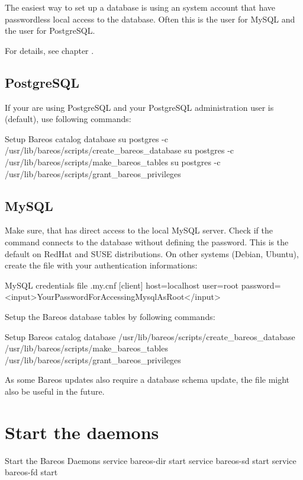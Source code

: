 The easiest way to set up a database is using an system account that have passwordless local access to the database. 
Often this is the user  for MySQL and the user  for PostgreSQL.

For details, see chapter .

\subsection{PostgreSQL}
If your are using PostgreSQL and your PostgreSQL administration user is  (default), use following commands:

\begin{commands}{Setup Bareos catalog database}
su postgres -c /usr/lib/bareos/scripts/create_bareos_database
su postgres -c /usr/lib/bareos/scripts/make_bareos_tables
su postgres -c /usr/lib/bareos/scripts/grant_bareos_privileges
\end{commands}


\subsection{MySQL}
Make sure, that  has direct access to the local MySQL server. 
Check if the command  connects to the database without defining the password.
This is the default on RedHat and SUSE distributions. 
On other systems (Debian, Ubuntu),
create the file  with your authentication informations:

\begin{config}{MySQL credentials file .my.cnf}
[client]
host=localhost
user=root
password=<input>YourPasswordForAccessingMysqlAsRoot</input>
\end{config}

Setup the Bareos database tables by following commands:
\begin{commands}{Setup Bareos catalog database}
/usr/lib/bareos/scripts/create_bareos_database
/usr/lib/bareos/scripts/make_bareos_tables
/usr/lib/bareos/scripts/grant_bareos_privileges
\end{commands}

As some Bareos updates also require a database schema update,
the file  might also be useful in the future.


\section{Start the daemons}
\begin{commands}{Start the Bareos Daemons}
service bareos-dir start
service bareos-sd start
service bareos-fd start
\end{commands}


